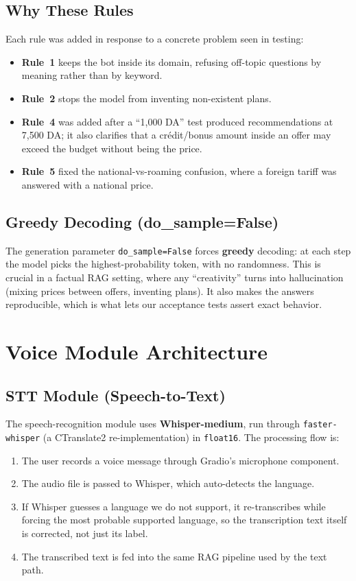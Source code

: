 \documentclass[12pt, a4paper]{report}
\newcommand{\humantext}[1]{#1}      %
\begin{document}
\subsection{Why These Rules}
\humantext{Each rule was added in response to a concrete problem seen in testing:}
\begin{itemize}[noitemsep]
    \item \humantext{\textbf{Rule~1} keeps the bot inside its domain, refusing off-topic questions by meaning rather than by keyword.}
    \item \humantext{\textbf{Rule~2} stops the model from inventing non-existent plans.}
    \item \humantext{\textbf{Rule~4} was added after a ``1{,}000 DA'' test produced recommendations at 7{,}500 DA; it also clarifies that a crédit/bonus amount inside an offer may exceed the budget without being the price.}
    \item \humantext{\textbf{Rule~5} fixed the national-vs-roaming confusion, where a foreign tariff was answered with a national price.}
\end{itemize}

\subsection{Greedy Decoding (do\_sample=False)}
\humantext{The generation parameter \texttt{do\_sample=False} forces \textbf{greedy} decoding: at each step the model picks the highest-probability token, with no randomness. This is crucial in a factual RAG setting, where any ``creativity'' turns into hallucination (mixing prices between offers, inventing plans). It also makes the answers reproducible, which is what lets our acceptance tests assert exact behavior.}

\section{Voice Module Architecture}

\subsection{STT Module (Speech-to-Text)}
\humantext{The speech-recognition module uses \textbf{Whisper-medium}, run through \texttt{faster-whisper} (a CTranslate2 re-implementation) in \texttt{float16}. The processing flow is:}
\begin{enumerate}[noitemsep]
    \item \humantext{The user records a voice message through Gradio's microphone component.}
    \item \humantext{The audio file is passed to Whisper, which auto-detects the language.}
    \item \humantext{If Whisper guesses a language we do not support, it re-transcribes while forcing the most probable supported language, so the transcription text itself is corrected, not just its label.}
    \item \humantext{The transcribed text is fed into the same RAG pipeline used by the text path.}
\end{enumerate}
\end{document}
